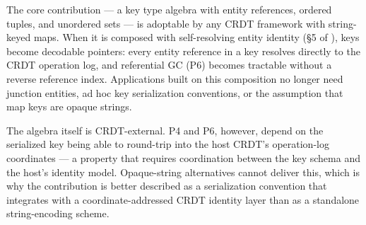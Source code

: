The core contribution --- a key type algebra with entity references, ordered tuples, and unordered sets --- is adoptable by any CRDT framework with string-keyed maps. When it is composed with self-resolving entity identity (\S 5 of \cite{plexus:arch}), keys become decodable pointers: every entity reference in a key resolves directly to the CRDT operation log, and referential GC (P6) becomes tractable without a reverse reference index. Applications built on this composition no longer need junction entities, ad hoc key serialization conventions, or the assumption that map keys are opaque strings.

The algebra itself is CRDT-external. P4 and P6, however, depend on the serialized key being able to round-trip into the host CRDT's operation-log coordinates --- a property that requires coordination between the key schema and the host's identity model. Opaque-string alternatives cannot deliver this, which is why the contribution is better described as a serialization convention that integrates with a coordinate-addressed CRDT identity layer than as a standalone string-encoding scheme.





